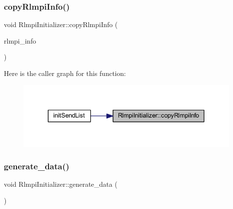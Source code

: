 \subsubsection{\texorpdfstring{copyRlmpiInfo()}{copyRlmpiInfo()}\hspace{0.1cm}{\footnotesize\ttfamily [2/2]}}
{\footnotesize\ttfamily void Rlmpi\+Initializer\+::copy\+Rlmpi\+Info (\begin{DoxyParamCaption}\item[{\mbox{\hyperlink{structRlmpiInfo}{Rlmpi\+Info}} $\ast$}]{rlmpi\+\_\+info }\end{DoxyParamCaption})}

Here is the caller graph for this function\+:
\nopagebreak
\begin{figure}[H]
\begin{center}
\leavevmode
\includegraphics[width=330pt]{classRlmpiInitializer_ad8f197f08ce0145b6fda9a2b973b615a_icgraph}
\end{center}
\end{figure}
\mbox{\label{classRlmpiInitializer_ab93e99398a7d1ef2a21748260945d0ef}} 
\subsubsection{\texorpdfstring{generate\_data()}{generate\_data()}\hspace{0.1cm}{\footnotesize\ttfamily [1/2]}}
{\footnotesize\ttfamily void Rlmpi\+Initializer\+::generate\+\_\+data (\begin{DoxyParamCaption}{ }\end{DoxyParamCaption})\hspace{0.3cm}{\ttfamily [protected]}}

\mbox{\label{classRlmpiInitializer_ab93e99398a7d1ef2a21748260945d0ef}} 
